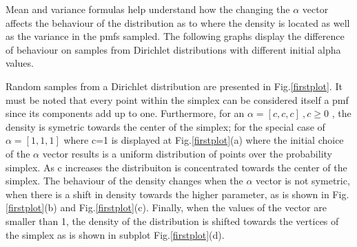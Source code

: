 \documentclass[twoside,hidelinks]{article}
\begin{document}
Mean and variance formulas help understand how the changing the $ \alpha $ vector affects the behaviour of the distribution as to where the density is located as well as the variance in the pmfs sampled. The following graphs display the difference of behaviour on samples from Dirichlet distributions with different initial alpha values.


Random samples from a Dirichlet distribution are presented in Fig.\ref{firstplot}. It must be noted that every point within the simplex can be considered itself a pmf since its components add up to one.  Furthermore, for an $ \alpha = [c,c,c]\ ,c \ge 0 $ , the density is symetric towards the center of the simplex; for the special case of $ \alpha = [1,1,1] $ where c=1 is displayed at Fig.\ref{firstplot}(a) where the initial choice of the $\alpha$ vector results is a uniform distribution of points over the probability simplex. As c increases the distribuiton is concentrated towards the center of the simplex. The behaviour of the density changes when the $\alpha$ vector is not symetric, when there is a shift in density towards the higher parameter, as is shown in Fig.\ref{firstplot}(b) and Fig.\ref{firstplot}(c). Finally, when the values of the vector are smaller than 1, the density of the distribution is shifted towards the vertices of the simplex as is shown in subplot Fig.\ref{firstplot}(d).
\end{document}
